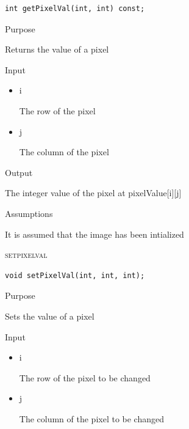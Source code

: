 \documentclass[pdftex, 11pt]{article}
\begin{document}
\begin{description}
\begin{description}
\begin{lstlisting}
int getPixelVal(int, int) const;
\end{lstlisting}

			\item{Purpose}

				Returns the value of a pixel

			\item{Input}

				\begin{itemize}

					\item{i}
					
						The row of the pixel

					\item{j} 

						The column of the pixel

				\end{itemize}

			\item{Output}

				The integer value of the pixel at 
				pixelValue[i][j]


			\item{Assumptions}

				It is assumed that the image has been intialized


		\end{description}


	\item{\textsc{setpixelval}}
		\begin{description}

\begin{lstlisting}
void setPixelVal(int, int, int);
\end{lstlisting}

			\item{Purpose}

				Sets the value of a pixel

			\item{Input}

				\begin{itemize}

					\item{i}

						The row of the pixel to be changed

					\item{j}

						The column of the pixel to be changed

				\end{itemize}


\end{description}
\end{description}
\end{document}
